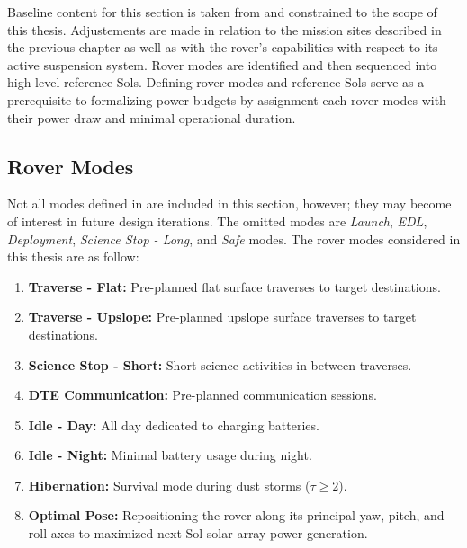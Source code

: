 Baseline content for this section is taken from  and constrained to the scope of this thesis. Adjustements are made in relation to the mission sites described in the previous chapter as well as with the rover's capabilities with respect to its active suspension system. Rover modes are identified and then sequenced into high-level reference Sols. Defining rover modes and reference Sols serve as a prerequisite to formalizing power budgets by assignment each rover modes with their power draw and minimal operational duration.


\subsection{Rover Modes}
\label{sec:ReferenceSols:RoverModes}
Not all modes defined in  are included in this section, however; they may become of interest in future design iterations. The omitted modes are \textit{Launch}, \textit{\ac{EDL}}, \textit{Deployment}, \textit{Science Stop - Long},  and \textit{Safe} modes. The rover modes considered in this thesis are as follow:

\begin{enumerate}[label=\textcolor{BulletBlue}{(\alph*)}]
    \item \textbf{Traverse - Flat:} Pre-planned flat surface traverses to target destinations.
    \item \textbf{Traverse - Upslope:} Pre-planned upslope surface traverses to target destinations.
    \item \textbf{Science Stop - Short:} Short science activities in between traverses.
    \item \textbf{\ac{DTE} Communication:} Pre-planned communication sessions.
    \item \textbf{Idle - Day:} All day dedicated to charging batteries.
    \item \textbf{Idle - Night:} Minimal battery usage during night.
    \item \textbf{Hibernation:} Survival mode during dust storms ($\tau \geq 2$).
    \item \textbf{Optimal Pose:} Repositioning the rover along its principal yaw, pitch, and roll axes to maximized next Sol solar array power generation.
\end{enumerate}

